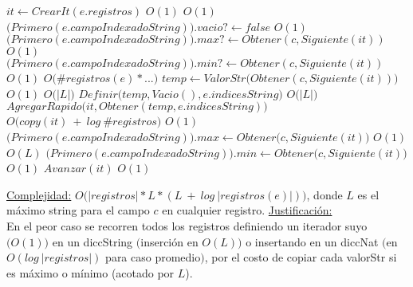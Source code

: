 \begin{Algoritmos}
\begin{algorithm}
\begin{algorithmic}
      \State $it \gets CrearIt(e.registros)$ \Comment $O(1)$
       \Comment $O(1)$
        \State $\big(Primero(e.campoIndexadoString)\big).vacio? \gets false$ \Comment $O(1)$ 
        \State $\big(Primero(e.campoIndexadoString)\big).max? \gets Obtener(c, Siguiente(it))$ \Comment $O(1)$
        \State $\big(Primero(e.campoIndexadoString)\big).min? \gets Obtener(c, Siguiente(it))$ \Comment $O(1)$
      \EndIf
       \Comment $O\big(\#registros(e) * ...\big)$
        \State $temp \gets ValorStr\big(Obtener(c, Siguiente(it))\big)$ \Comment $O(1)$
         \Comment $O\big(|L|\big)$
            \State $Definir\big(temp, Vacio(), e.indicesString\big)$ \Comment $O\big(|L|\big)$
        \EndIf
        \State $AgregarRapido\big(it, Obtener(temp, e.indicesString)\big)$ \Comment $O\big(copy(it)\ +\ log\ \#registros\big)$
         \Comment $O(1)$
          \State $\big(Primero(e.campoIndexadoString)\big).max \gets Obtener\big(c, Siguiente(it)\big)$ \Comment $O(1)$
        \EndIf
         \Comment $O(L)$
          \State $\big(Primero(e.campoIndexadoString)\big).min \gets Obtener\big(c, Siguiente(it)\big)$ \Comment $O(1)$
        \EndIf
        \State $Avanzar(it)$ \Comment $O(1)$
      \EndWhile
    \EndIf


    \medskip
    \Statex \underline{Complejidad:} {$O\big(|registros| * L * (L\ +\ log\ |registros(e)|)\big)$, donde $L$ es el máximo string para el campo $c$ en cualquier registro.}
    \Statex \underline{Justificación:} {\\
\quad\quad En el peor caso se recorren todos los registros definiendo un iterador suyo $\big(O(1)\big)$ en un diccString $\big($inserción en $O(L)\big)$ o insertando en un diccNat $\big($en $O(log\ |registros|)$ para caso promedio$\big)$, por el costo de copiar cada valorStr si es máximo o mínimo (acotado por $L$).
}
  \end{algorithmic}
\end{algorithm}




\end{Algoritmos}
